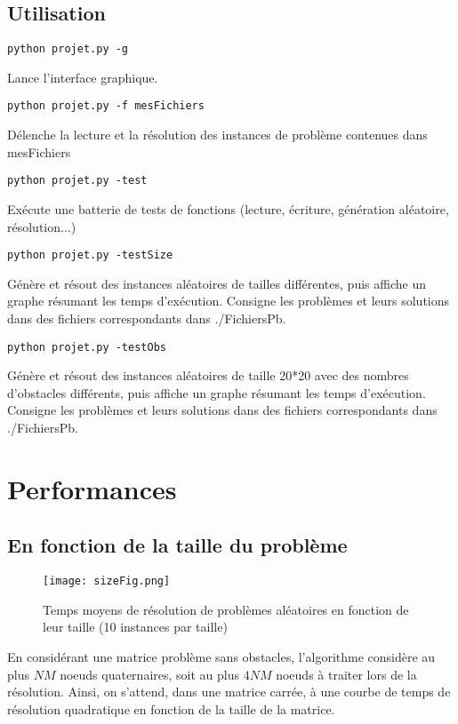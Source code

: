 \documentclass{article}
\begin{document}
\subsection{Utilisation}
\begin{verbatim}
python projet.py -g
\end{verbatim}
Lance l'interface graphique.
\begin{verbatim}
python projet.py -f mesFichiers
\end{verbatim}
Délenche la lecture et la résolution des instances de problème contenues dans mesFichiers
\begin{verbatim}
python projet.py -test
\end{verbatim}
Exécute une batterie de tests de fonctions (lecture, écriture, génération aléatoire, résolution...)
\begin{verbatim}
python projet.py -testSize
\end{verbatim}
Génère et résout des instances aléatoires de tailles différentes, puis affiche un graphe résumant les temps d'exécution.
Consigne les problèmes et leurs solutions dans des fichiers correspondants dans ./FichiersPb.
\begin{verbatim}
python projet.py -testObs
\end{verbatim}
Génère et résout des instances aléatoires de taille 20*20 avec des nombres d'obstacles différents, puis affiche un graphe résumant les temps d'exécution.
Consigne les problèmes et leurs solutions dans des fichiers correspondants dans ./FichiersPb.
\section{Performances}
\subsection{En fonction de la taille du problème}
\begin{figure}[!ht]
\centering
\texttt{[image: sizeFig.png]}
\caption{Temps moyens de résolution de problèmes aléatoires en fonction de leur taille (10 instances par taille)}
\end{figure}
En considérant une matrice problème sans obstacles, l'algorithme considère au plus $NM$ noeuds quaternaires, soit au plus $4NM$ noeuds à traiter lors de la résolution. Ainsi, on s'attend, dans une matrice carrée, à une courbe de temps de résolution quadratique en fonction de la taille de la matrice. 
\end{document}
